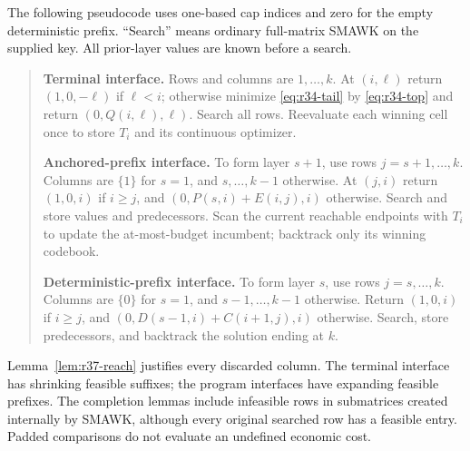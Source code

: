 The following pseudocode uses one-based cap indices and zero for the empty deterministic prefix. ``Search'' means ordinary full-matrix SMAWK on the supplied key. All prior-layer values are known before a search.
\begin{quote}\small
\textbf{Terminal interface.} Rows and columns are $1,\ldots,k$. At $(i,\ell)$ return $(1,0,-\ell)$ if $\ell<i$; otherwise minimize \eqref{eq:r34-tail} by \eqref{eq:r34-top} and return $(0,Q(i,\ell),\ell)$. Search all rows. Reevaluate each winning cell once to store $T_i$ and its continuous optimizer.

\textbf{Anchored-prefix interface.} To form layer $s+1$, use rows $j=s+1,\ldots,k$. Columns are $\{1\}$ for $s=1$, and $s,\ldots,k-1$ otherwise. At $(j,i)$ return $(1,0,i)$ if $i\geq j$, and $(0,P(s,i)+E(i,j),i)$ otherwise. Search and store values and predecessors. Scan the current reachable endpoints with $T_i$ to update the at-most-budget incumbent; backtrack only its winning codebook.

\textbf{Deterministic-prefix interface.} To form layer $s$, use rows $j=s,\ldots,k$. Columns are $\{0\}$ for $s=1$, and $s-1,\ldots,k-1$ otherwise. Return $(1,0,i)$ if $i\geq j$, and $(0,D(s-1,i)+C(i+1,j),i)$ otherwise. Search, store predecessors, and backtrack the solution ending at $k$.
\end{quote}
Lemma~\ref{lem:r37-reach} justifies every discarded column. The terminal interface has shrinking feasible suffixes; the program interfaces have expanding feasible prefixes. The completion lemmas include infeasible rows in submatrices created internally by SMAWK, although every original searched row has a feasible entry. Padded comparisons do not evaluate an undefined economic cost.

